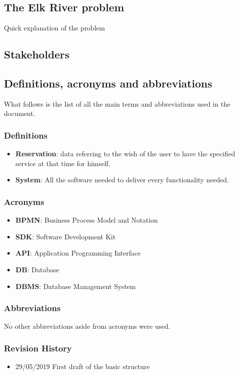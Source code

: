 \subsection{The Elk River problem}
Quick explanation of the problem
\subsection{Stakeholders}

\subsection{Definitions, acronyms and abbreviations}
What follows is the list of all the main terms and abbreviations used in the document.
\subsubsection{Definitions}
\begin{itemize}
\item \textbf{Reservation}: data referring to the wish of the user to have the specified service at that time for himself.
\item \textbf{System}: All the software needed to deliver every functionality needed.
\end{itemize}
\subsubsection{Acronyms}
\begin{itemize}
\item \textbf{BPMN}: Business Process Model and Notation
\item \textbf{SDK}: Software Development Kit
\item \textbf{API}: Application Programming Interface
\item \textbf{DB}: Database
\item \textbf{DBMS}: Database Management System
\end{itemize}
\subsubsection{Abbreviations}
No other abbreviations aside from acronyms were used.
\subsubsection{Revision History}
\begin{itemize}
\item 29/05/2019 First draft of the basic structure
\end{itemize}